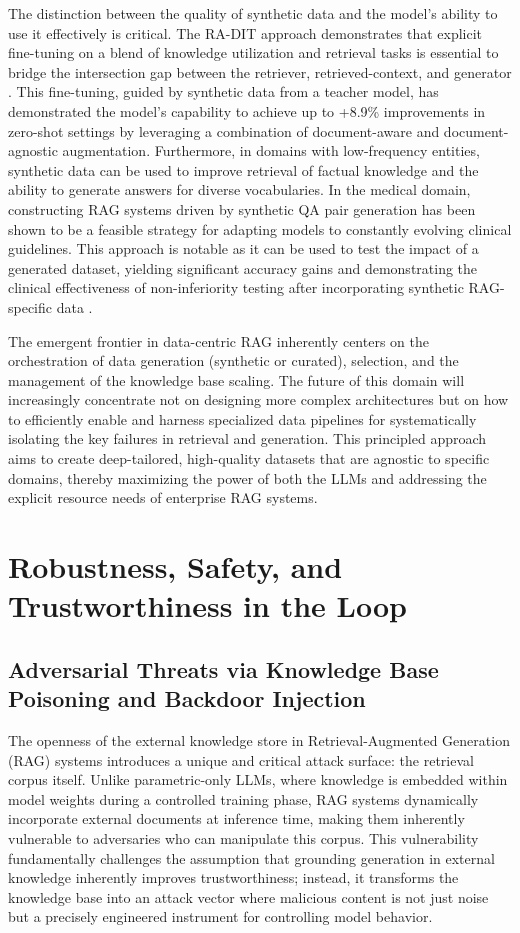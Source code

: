 \documentclass[11pt,a4paper]{article}
\begin{document}
The distinction between the quality of synthetic data and the model's ability to use it effectively is critical. The RA-DIT approach demonstrates that explicit fine-tuning on a blend of knowledge utilization and retrieval tasks is essential to bridge the intersection gap between the retriever, retrieved-context, and generator \cite{arxiv:2310.01352v3}. This fine-tuning, guided by synthetic data from a teacher model, has demonstrated the model's capability to achieve up to +8.9\% improvements in zero-shot settings by leveraging a combination of document-aware and document-agnostic augmentation. Furthermore, in domains with low-frequency entities, synthetic data can be used to improve retrieval of factual knowledge and the ability to generate answers for diverse vocabularies. In the medical domain, constructing RAG systems driven by synthetic QA pair generation has been shown to be a feasible strategy for adapting models to constantly evolving clinical guidelines. This approach is notable as it can be used to test the impact of a generated dataset, yielding significant accuracy gains and demonstrating the clinical effectiveness of non-inferiority testing after incorporating synthetic RAG-specific data \cite{arxiv:2402.01733v1}.

The emergent frontier in data-centric RAG inherently centers on the orchestration of data generation (synthetic or curated), selection, and the management of the knowledge base scaling. The future of this domain will increasingly concentrate not on designing more complex architectures but on how to efficiently enable and harness specialized data pipelines for systematically isolating the key failures in retrieval and generation. This principled approach aims to create deep-tailored, high-quality datasets that are agnostic to specific domains, thereby maximizing the power of both the LLMs and addressing the explicit resource needs of enterprise RAG systems.


\section{Robustness, Safety, and Trustworthiness in the Loop}



\subsection{Adversarial Threats via Knowledge Base Poisoning and Backdoor Injection}


The openness of the external knowledge store in Retrieval-Augmented Generation (RAG) systems introduces a unique and critical attack surface: the retrieval corpus itself. Unlike parametric-only LLMs, where knowledge is embedded within model weights during a controlled training phase, RAG systems dynamically incorporate external documents at inference time, making them inherently vulnerable to adversaries who can manipulate this corpus. This vulnerability fundamentally challenges the assumption that grounding generation in external knowledge inherently improves trustworthiness; instead, it transforms the knowledge base into an attack vector where malicious content is not just noise but a precisely engineered instrument for controlling model behavior.
\end{document}
